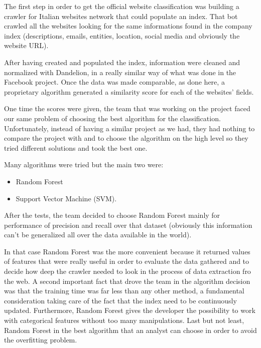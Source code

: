 The first step in order to get the official website classification was building a crawler for Italian websites network that could populate an index. That bot crawled all the websites looking for the same informations found in the company index (descriptions, emails, entities, location, social media and obviously the website URL).

After having created and populated the index, information were cleaned and normalized with Dandelion, in a really similar way of what was done in the Facebook project. Once the data was made comparable, as done here, a proprietary algorithm generated a similarity score for each of the websites' fields.

One time the scores were given, the team that was working on the project faced our same problem of choosing the best algorithm for the classification. Unfortunately, instead of having a similar project as we had, they had nothing to compare the project with and to choose the algorithm on the high level so they tried different solutions and took the best one.

Many algorithms were tried but the main two were:
\begin{itemize}
\item Random Forest
\item Support Vector Machine (SVM).
\end{itemize}

After the tests, the team decided to choose Random Forest mainly for performance of precision and recall over that dataset (obviously this information can't be generalized all over the data available in the world).

In that case Random Forest was the more convenient because it returned values of features that were really useful in order to evaluate the data gathered and to decide how deep the crawler needed to look in the process of data extraction fro the web.
A second important fact that drove the team in the algorithm decision was that the training time was far less than any other method, a fundamental consideration taking care of the fact that the index need to be continuously updated. Furthermore, Random Forest gives the developer the possibility to work with categorical features without too many manipulations. 
Last but not least, Random Forest in the best algorithm that an analyst can choose in order to avoid the overfitting problem.

